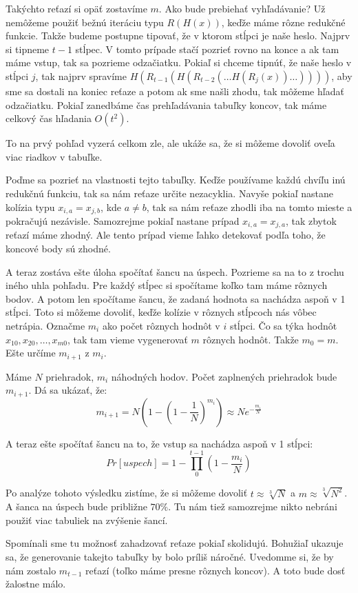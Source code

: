 Takýchto reťazí si opäť zostavíme $m$. Ako bude prebiehať vyhľadávanie? 
Už nemôžeme použiť bežnú iteráciu typu $R(H(x))$, keďže máme rôzne redukčné funkcie.
Takže budeme postupne tipovať, že v ktorom stĺpci je naše heslo. Najprv si tipneme $t-1$
stĺpec. V tomto prípade stačí pozrieť rovno na konce a ak tam máme vstup, tak sa pozrieme odzačiatku.
Pokiaľ si chceme tipnúť, že naše heslo v stĺpci $j$, tak najprv spravíme $H(R_{t-1}(H(R_{t-2}(\dots H(R_j(x))\dots))))$, aby
sme sa dostali na koniec reťaze a potom ak sme našli zhodu, tak môžeme hľadať odzačiatku.
Pokiaľ zanedbáme čas prehľadávania tabuľky koncov, tak máme celkový čas hľadania $O(t^2)$. 

To na prvý pohľad vyzerá celkom zle, ale ukáže sa, že si môžeme dovoliť oveľa viac riadkov v tabuľke.

Poďme sa pozrieť na vlastnosti tejto tabuľky. Keďže používame každú chvíľu inú redukčnú funkciu, tak sa nám
reťaze určite nezacyklia. Navyše pokiaľ nastane kolízia typu $x_{i,a} = x_{j,b}$, kde $a\neq b$, tak sa nám
reťaze zhodli iba na tomto mieste a pokračujú nezávisle. Samozrejme pokiaľ nastane prípad $x_{i,a} = x_{j,a}$, tak
zbytok reťazí máme zhodný. Ale tento prípad vieme ľahko detekovať podľa toho, že koncové body sú zhodné.

A teraz zostáva ešte úloha spočítať šancu na úspech.
Pozrieme sa na to z trochu iného uhla pohľadu. Pre každý stĺpec si spočítame koľko tam máme rôznych bodov.
A potom len spočítame šancu, že zadaná hodnota sa nachádza aspoň v 1 stĺpci. Toto si môžeme dovoliť, keďže
kolízie v rôznych stĺpcoch nás vôbec netrápia. 
Označme $m_i$ ako počet rôznych hodnôt v $i$ stĺpci.
Čo sa týka hodnôt $x_{10}, x_{20}, \dots, x_{m0}$, tak tam vieme vygenerovať $m$ rôznych hodnôt.
Takže $m_0 = m$. Ešte určíme $m_{i+1}$ z $m_i$.

Máme $N$ priehradok, $m_i$ náhodných hodov. Počet zaplnených priehradok bude $m_{i+1}$. 
Dá sa ukázať, že:
\begin{equation*}
m_{i+1} = N \left ( 1 - (1 - \frac{1}{N})^{m_i} \right ) \approx N e^{-\frac{m_i}{N}}
\end{equation*}

A teraz ešte spočítať šancu na to, že vstup sa nachádza aspoň v 1 stĺpci:
\begin{equation*}
Pr[uspech] = 1 - \prod_0^{t-1} \left (1 - \frac{m_i}{N} \right)
\end{equation*}

Po analýze tohoto výsledku zistíme, že si môžeme dovoliť
$t \approx \sqrt[3]{N}$ a $m \approx \sqrt[3]{N^2}$. A šanca na úspech bude približne $70\%$.
Tu nám tiež samozrejme nikto nebráni použiť viac tabuliek na zvýšenie šancí.

\begin{poznamka}
Spomínali sme tu možnosť zahadzovať reťaze pokiaľ skolidujú. Bohužiaľ ukazuje sa, že
generovanie takejto tabuľky by bolo príliš náročné. Uvedomme si, že by nám zostalo
$m_{t-1}$ reťazí (toľko máme presne rôznych koncov). A toto bude dosť žalostne málo.
\end{poznamka}
